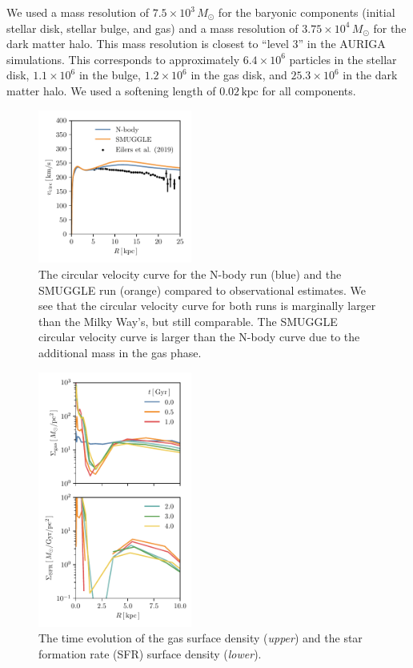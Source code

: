 \documentclass{natureprintstyle}
\begin{document}
We used a mass resolution of $7.5\times10^3\,M_{\odot}$ for the baryonic
components (initial stellar disk, stellar bulge, and gas) and a mass
resolution of $3.75\times10^4\,M_{\odot}$ for the dark matter halo. This mass
resolution is closest to ``level 3'' in the AURIGA
simulations.\cite{2017MNRAS.467..179G} This corresponds to approximately
$6.4\times10^6$ particles in the stellar disk, $1.1\times10^6$ in the bulge,
$1.2\times10^6$ in the gas disk, and $25.3\times10^6$ in the dark matter halo.
We used a softening length of $0.02\,\textrm{kpc}$ for all components.

\begin{figure}[h]%
\centering
\includegraphics[width=0.45\textwidth]{fig/fig-vcirc.pdf}
\caption{The circular velocity curve for the N-body run (blue) and the SMUGGLE
run (orange) compared to observational estimates.\cite{2019ApJ...871..120E} We
see that the circular velocity curve for both runs is marginally larger than
the Milky Way's, but still comparable. The SMUGGLE circular velocity curve is
larger than the N-body curve due to the additional mass in the gas phase.}
\label{fig:surf}
\end{figure}

\begin{figure}[h]%
\centering
\includegraphics[width=0.45\textwidth]{fig/fig-surf.pdf}
\caption{The time evolution of the gas surface density (\textit{upper}) and the star formation rate (SFR) surface density (\textit{lower}).  } \label{fig:surf}
\end{figure}
\end{document}
